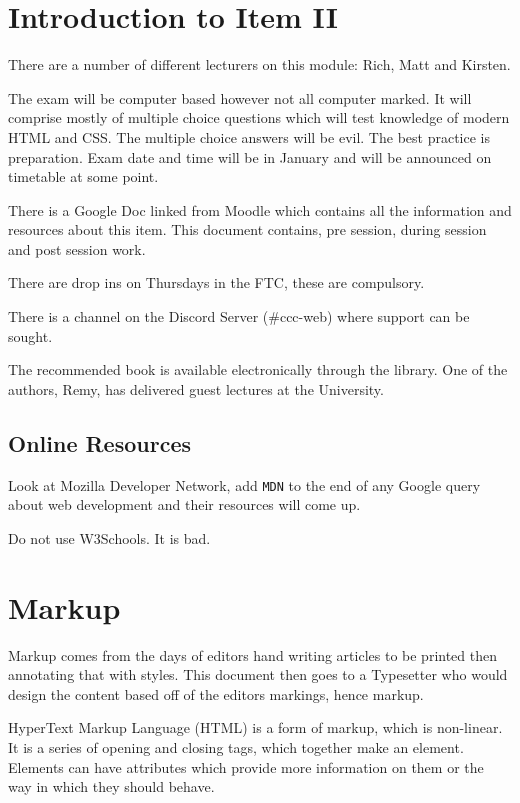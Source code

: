 
\section*{Introduction to Item II}
There are a number of different lecturers on this module: Rich, Matt and Kirsten.

The exam will be computer based however not all computer marked. It will comprise mostly of multiple choice questions which will test knowledge of modern HTML and CSS. The multiple choice answers will be evil. The best practice is preparation. Exam date and time will be in January and will be announced on timetable at some point.

There is a Google Doc linked from Moodle which contains all the information and resources about this item. This document contains, pre session, during session and post session work.

There are drop ins on Thursdays in the FTC, these are compulsory. 

There is a channel on the Discord Server (\#ccc-web) where support can be sought.

The recommended book is available electronically through the library. One of the authors, Remy, has delivered guest lectures at the University.

\subsection*{Online Resources}
Look at Mozilla Developer Network, add \texttt{MDN} to the end of any Google query about web development and their resources will come up.

Do not use W3Schools. It is bad.

\section*{Markup}
Markup comes from the days of editors hand writing articles to be printed then annotating that with styles. This document then goes to a Typesetter who would design the content based off of the editors markings, hence markup.

HyperText Markup Language (HTML) is a form of markup, which is non-linear. It is a series of opening and closing tags, which together make an element. Elements can have attributes which provide more information on them or the way in which they should behave. 

